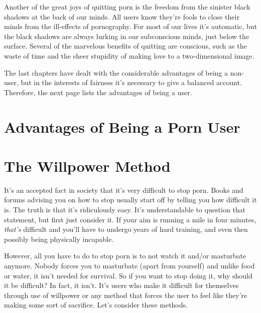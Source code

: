 \documentclass[
]{book}
\begin{document}
Another of the great joys of quitting porn is the freedom from the sinister black shadows at the back of our minds. All users know they're fools to close their minds from the ill-effects of pornography. For most of our lives it's automatic, but the black shadows are always lurking in our subconscious minds, just below the surface. Several of the marvelous benefits of quitting are conscious, such as the waste of time and the sheer stupidity of making love to a two-dimensional image.

The last chapters have dealt with the considerable advantages of being a non-user, but in the interests of fairness it's necessary to give a balanced account. Therefore, the next page lists the advantages of being a user.

\hypertarget{advantages-of-being-a-porn-user}{%
\chapter{Advantages of Being a Porn User}\label{advantages-of-being-a-porn-user}}

\hypertarget{the-willpower-method-1}{%
\chapter{The Willpower Method}\label{the-willpower-method-1}}

It's an accepted fact in society that it's very difficult to stop porn. Books and forums advising you on how to stop usually start off by telling you how difficult it is. The truth is that it's ridiculously easy. It's understandable to question that statement, but first just consider it. If your aim is running a mile in four minutes, \emph{that's} difficult and you'll have to undergo years of hard training, and even then possibly being physically incapable.

However, all you have to do to stop porn is to not watch it and/or masturbate anymore. Nobody forces you to masturbate (apart from yourself) and unlike food or water, it isn't needed for survival. So if you want to stop doing it, why should it be difficult? In fact, it isn't. It's users who make it difficult for themselves through use of willpower or any method that forces the user to feel like they're making some sort of sacrifice. Let's consider these methods.
\end{document}
